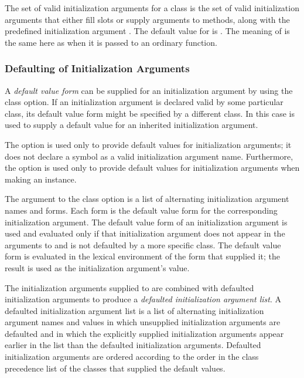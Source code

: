 The set of valid initialization arguments for a class is the set of
valid initialization arguments that either fill slots or supply
arguments to methods, along with the predefined initialization
argument .  The default value for 
 is .  The meaning of 
 is the same here as when it is passed to an ordinary
function.


\subsubsection{Defaulting of Initialization Arguments}

A \emph{default value form\/} can be supplied for an initialization
argument by using the  class option.  If an
initialization argument is declared valid by some particular class,
its default  value form might be specified by a different class. 
In this case  is used to supply a default value
for an inherited initialization argument.

The  option is used only to provide default
values for initialization arguments; it does not declare a symbol as a
valid initialization argument name.  Furthermore, the 
 option is used only to provide default values for
initialization arguments when making an instance.

The argument to the  class option is a list of
alternating initialization argument names and forms.  Each form is the
default  value form for the corresponding initialization
argument.  The default  value form of an initialization
argument is used and evaluated only if that initialization argument
does not appear in the arguments to  and is not
defaulted by a more specific class.  The default  value form is
evaluated in the lexical environment of the  form that
supplied it; the result is used as the initialization
argument's value.

The initialization arguments supplied to  are combined
with defaulted initialization arguments to produce a \emph{
defaulted initialization argument list}. A defaulted initialization
argument list is a list of alternating initialization argument names and
values in which unsupplied initialization arguments are defaulted and in
which the explicitly supplied initialization arguments appear earlier in
the list than the defaulted initialization arguments.  Defaulted
initialization arguments are ordered according to the order in the class
precedence list of the classes that supplied the default values.

